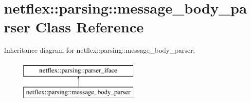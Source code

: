 \hypertarget{classnetflex_1_1parsing_1_1message__body__parser}{}\section{netflex\+:\+:parsing\+:\+:message\+\_\+body\+\_\+parser Class Reference}
\label{classnetflex_1_1parsing_1_1message__body__parser}
Inheritance diagram for netflex\+:\+:parsing\+:\+:message\+\_\+body\+\_\+parser\+:\begin{figure}[H]
\begin{center}
\leavevmode
\includegraphics[height=2.000000cm]{classnetflex_1_1parsing_1_1message__body__parser}
\end{center}
\end{figure}
